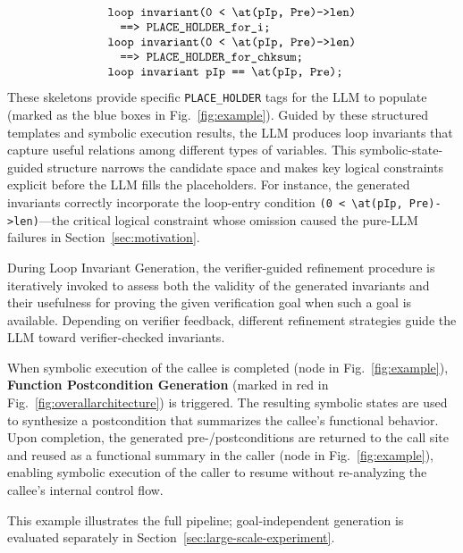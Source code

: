 {
\footnotesize
\[
\begin{array}{@{}l@{}}

  \texttt{loop invariant} \texttt{(0 < \textbackslash at(pIp, Pre)->len)} \\
  \quad \texttt{==> PLACE\_HOLDER\_for\_i;} \\
  \texttt{loop invariant} \texttt{(0 < \textbackslash at(pIp, Pre)->len)} \\
  \quad \texttt{==> PLACE\_HOLDER\_for\_chksum;} \\
  \texttt{loop invariant pIp == \textbackslash at(pIp, Pre);}

\end{array}
\]
}
These skeletons provide specific \texttt{PLACE\_HOLDER} tags for the LLM to populate (marked as the blue boxes in Fig.~\ref{fig:example}). Guided by these structured templates and symbolic execution results,
the LLM produces loop invariants that capture useful relations among different types of variables. This symbolic-state-guided structure narrows the candidate space and makes key logical constraints explicit before the LLM fills the placeholders. For instance, the generated invariants correctly incorporate the loop-entry condition \texttt{(0 < \textbackslash at(pIp, Pre)->len)}---the critical logical constraint whose omission caused the pure-LLM failures in Section~\ref{sec:motivation}.

During Loop Invariant Generation, the verifier-guided refinement procedure is iteratively invoked to assess both the validity of the generated invariants and their usefulness for proving the given verification goal when such a goal is available. Depending on verifier feedback, different refinement strategies guide the LLM toward verifier-checked invariants. 

When symbolic execution of the callee is completed (node  in Fig.~\ref{fig:example}), \textbf{Function Postcondition Generation} (marked in red in Fig.~\ref{fig:overallarchitecture}) is triggered. The resulting symbolic states are used to synthesize a postcondition that summarizes the callee's functional behavior. Upon completion, the generated pre-/postconditions are returned to the call site and reused as a functional summary in the caller (node  in Fig.~\ref{fig:example}), enabling symbolic execution of the caller to resume without re-analyzing the callee's internal control flow. 







This example illustrates the full pipeline; goal-independent generation is evaluated separately in Section~\ref{sec:large-scale-experiment}.

